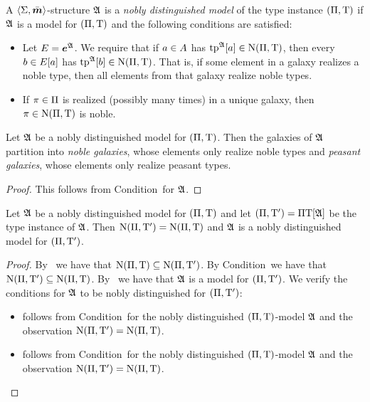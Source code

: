\begin{definition}
A $\left\langle \mathrm{\Sigma},\bar{\bm{m}} \right\rangle$-structure $\mathfrak{A}$ is a \emph{nobly distinguished model} of
the type instance $(\Pi,\mathrm{T})$ if $\mathfrak{A}$ is a model for $(\Pi,\mathrm{T})$
and the following conditions are satisfied:
\begin{itemize}
  \item[\condrealizd]\label{cond:realizd}
  Let $E = \bm{e}^{\mathfrak{A}}$. We require that if $a \in
  A$ has $\operatorname{tp}^{\mathfrak{A}}[a] \in \mathrm{\mathrm{N}}(\Pi,\mathrm{T})$, then every $b \in E[a]$
  has $\operatorname{tp}^{\mathfrak{A}}[b] \in \mathrm{\mathrm{N}}(\Pi,\mathrm{T})$. That is, if some element in a galaxy
  realizes a noble type, then all elements from that galaxy realize noble types.
  \item[\condrealizn]\label{cond:realizn}
  If $\pi \in \Pi$ is realized
  (possibly many times) in a unique galaxy, then $\pi \in \mathrm{\mathrm{N}}(\Pi,\mathrm{T})$ is
  noble.
\end{itemize}
\end{definition}
\begin{remark}\label{rem:ndis-split}
Let $\mathfrak{A}$ be a nobly distinguished model for $(\Pi,\mathrm{T})$. 
Then the galaxies of $\mathfrak{A}$ partition into \emph{noble galaxies}, whose
elements only realize noble types and \emph{peasant galaxies}, whose elements only realize peasant types.
\end{remark}
\begin{proof}
This follows from Condition~ for $\mathfrak{A}$.
\end{proof}

\begin{remark}\label{rem:tpi-nd-str}
Let $\mathfrak{A}$ be a nobly distinguished model for $(\Pi,\mathrm{T})$
and let $(\Pi,{\mathrm{T}'}) = \Pi\mathrm{T}[\mathfrak{A}]$ be the type instance of $\mathfrak{A}$.
Then $\mathrm{\mathrm{N}}(\Pi,{\mathrm{T}'}) = \mathrm{\mathrm{N}}(\Pi,\mathrm{T})$ and $\mathfrak{A}$ is a nobly distinguished
model for $(\Pi,{\mathrm{T}'})$.
\end{remark}
\begin{proof}
By~ we have that $\mathrm{\mathrm{N}}(\Pi,\mathrm{T}) \subseteq
\mathrm{\mathrm{N}}(\Pi,{\mathrm{T}'})$.
By Condition~ we have that
$\mathrm{\mathrm{N}}(\Pi,{\mathrm{T}'}) \subseteq \mathrm{\mathrm{N}}(\Pi,\mathrm{T})$.
By~ we have that $\mathfrak{A}$ is a model for
$(\Pi,{\mathrm{T}'})$.
We verify the conditions for $\mathfrak{A}$ to be nobly distinguished for
$(\Pi,{\mathrm{T}'})$:
\begin{itemize}
  \item[\refcondrealizd]
  follows from Condition~ for the nobly distinguished
  $(\Pi,\mathrm{T})$-model $\mathfrak{A}$ and the observation $\mathrm{\mathrm{N}}(\Pi,{\mathrm{T}'}) =
  \mathrm{\mathrm{N}}(\Pi,\mathrm{T})$.
  \item[\refcondrealizn]
  follows from Condition~ for the nobly distinguished
  $(\Pi,\mathrm{T})$-model $\mathfrak{A}$ and the observation $\mathrm{\mathrm{N}}(\Pi,{\mathrm{T}'}) =
  \mathrm{\mathrm{N}}(\Pi,\mathrm{T})$.
\end{itemize}
\end{proof}

